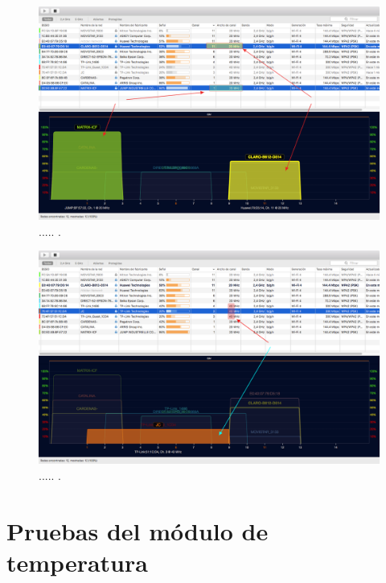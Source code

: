 \begin{landscape} %
\begin{figure}[htpb]
\centering 
\includegraphics[width=1.5\textwidth]{./Figures/wifi/05.png}
\caption{..... .}
\label{fig:test05}
\end{figure}
\end{landscape} %



\begin{landscape} %
\begin{figure}[htpb]
\centering 
\includegraphics[width=1.5\textwidth]{./Figures/wifi/06.png}
\caption{..... .}
\label{fig:test06}
\end{figure}
\end{landscape} %


\section{Pruebas del módulo de temperatura}
